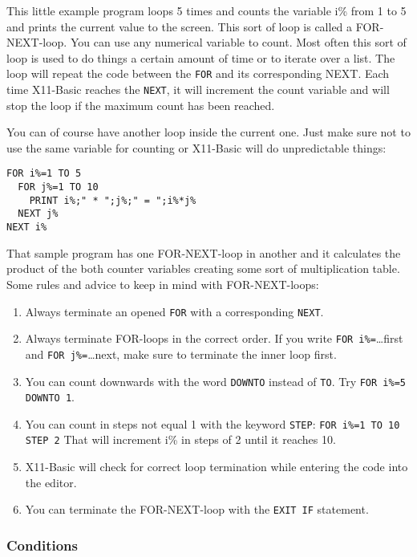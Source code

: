 This little example program loops 5 times and counts the variable i\% from 1 to
5 and prints the current value to the screen. This sort of loop is called a
FOR-NEXT-loop. You can use any numerical variable to count. Most often this
sort of loop is used to do things a certain amount of time or to iterate over a
list. The loop will repeat the code between the \verb|FOR| and its corresponding NEXT.
Each time X11-Basic reaches the \verb|NEXT|, it will increment the count variable and
will stop the loop if the maximum count has been reached.

You can of course have another loop inside the current one. Just make sure not
to use the same variable for counting or X11-Basic will do unpredictable things:
\begin{mdframed}[hidealllines=true,backgroundcolor=blue!20]
\begin{verbatim}
FOR i%=1 TO 5
  FOR j%=1 TO 10
    PRINT i%;" * ";j%;" = ";i%*j%
  NEXT j%
NEXT i%
\end{verbatim}
\end{mdframed}

That sample program has one FOR-NEXT-loop in another and it calculates the
product of the both counter variables creating some sort of multiplication
table. Some rules and advice to keep in mind with FOR-NEXT-loops:

\begin{enumerate}
\item Always terminate an opened \verb|FOR| with a corresponding \verb|NEXT|.
\item Always
terminate FOR-loops in the correct order. If you write \verb|FOR i%=|\dots first and 
\verb|FOR j%=|\dots next, make sure to terminate the inner loop first.
\item You can count
downwards with the word \verb|DOWNTO| instead of \verb|TO|.
Try \verb|FOR i%=5 DOWNTO 1|. 
\item You
can count in steps not equal 1 with the keyword \verb|STEP|: 
\verb|FOR i%=1 TO 10 STEP 2|
That will increment i\% in steps of 2 until it reaches 10. 
\item X11-Basic will
check for correct loop termination while entering the code into the editor. 
\item You can terminate the FOR-NEXT-loop with the \verb|EXIT IF| statement.
\end{enumerate}

\subsubsection{Conditions}

